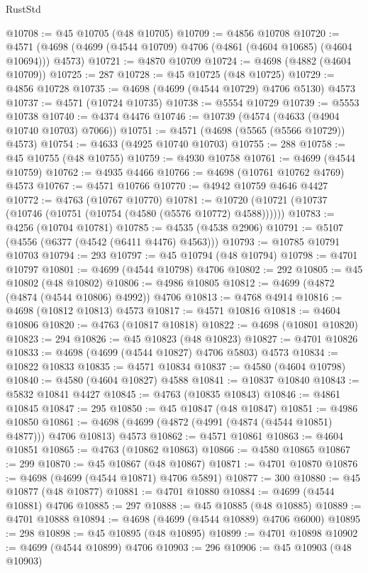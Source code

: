 \begin{lexlean}{RustStd}
\begin{coremodule}
@10708 := @45 @10705 (@48 @10705)
@10709 := @4856 @10708
@10720 := @4571 (@4698 (@4699 (@4544 @10709) @4706 (@4861 (@4604 @10685) (@4604 @10694))) @4573)
@10721 := @4870 @10709
@10724 := @4698 (@4882 (@4604 @10709))
@10725 := 287
@10728 := @45 @10725 (@48 @10725)
@10729 := @4856 @10728
@10735 := @4698 (@4699 (@4544 @10729) @4706 @5130) @4573
@10737 := @4571 (@10724 @10735)
@10738 := @5554 @10729
@10739 := @5553 @10738
@10740 := @4374 @4476
@10746 := @10739 (@4574 (@4633 (@4904 @10740 @10703) @7066))
@10751 := @4571 (@4698 (@5565 (@5566 @10729)) @4573)
@10754 := @4633 (@4925 @10740 @10703)
@10755 := 288
@10758 := @45 @10755 (@48 @10755)
@10759 := @4930 @10758
@10761 := @4699 (@4544 @10759)
@10762 := @4935 @4466
@10766 := @4698 (@10761 @10762 @4769) @4573
@10767 := @4571 @10766
@10770 := @4942 @10759 @4646 @4427
@10772 := @4763 (@10767 @10770)
@10781 := @10720 (@10721 (@10737 (@10746 (@10751 (@10754 (@4580 (@5576 @10772) @4588))))))
@10783 := @4256 (@10704 @10781)
@10785 := @4535 (@4538 @2906)
@10791 := @5107 (@4556 (@6377 (@4542 (@6411 @4476) @4563)))
@10793 := @10785 @10791 @10703
@10794 := 293
@10797 := @45 @10794 (@48 @10794)
@10798 := @4701 @10797
@10801 := @4699 (@4544 @10798) @4706
@10802 := 292
@10805 := @45 @10802 (@48 @10802)
@10806 := @4986 @10805
@10812 := @4699 (@4872 (@4874 (@4544 @10806) @4992)) @4706
@10813 := @4768 @4914
@10816 := @4698 (@10812 @10813) @4573
@10817 := @4571 @10816
@10818 := @4604 @10806
@10820 := @4763 (@10817 @10818)
@10822 := @4698 (@10801 @10820)
@10823 := 294
@10826 := @45 @10823 (@48 @10823)
@10827 := @4701 @10826
@10833 := @4698 (@4699 (@4544 @10827) @4706 @5803) @4573
@10834 := @10822 @10833
@10835 := @4571 @10834
@10837 := @4580 (@4604 @10798)
@10840 := @4580 (@4604 @10827) @4588
@10841 := @10837 @10840
@10843 := @5832 @10841 @4427
@10845 := @4763 (@10835 @10843)
@10846 := @4861 @10845
@10847 := 295
@10850 := @45 @10847 (@48 @10847)
@10851 := @4986 @10850
@10861 := @4698 (@4699 (@4872 (@4991 (@4874 (@4544 @10851) @4877))) @4706 @10813) @4573
@10862 := @4571 @10861
@10863 := @4604 @10851
@10865 := @4763 (@10862 @10863)
@10866 := @4580 @10865
@10867 := 299
@10870 := @45 @10867 (@48 @10867)
@10871 := @4701 @10870
@10876 := @4698 (@4699 (@4544 @10871) @4706 @5891)
@10877 := 300
@10880 := @45 @10877 (@48 @10877)
@10881 := @4701 @10880
@10884 := @4699 (@4544 @10881) @4706
@10885 := 297
@10888 := @45 @10885 (@48 @10885)
@10889 := @4701 @10888
@10894 := @4698 (@4699 (@4544 @10889) @4706 @6000)
@10895 := 298
@10898 := @45 @10895 (@48 @10895)
@10899 := @4701 @10898
@10902 := @4699 (@4544 @10899) @4706
@10903 := 296
@10906 := @45 @10903 (@48 @10903)

\end{coremodule}
\end{lexlean}
